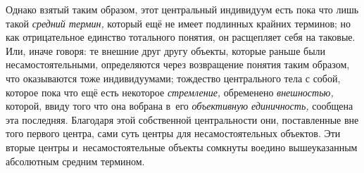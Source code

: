Однако взятый таким образом, этот центральный индивидуум есть
пока что лишь такой {\em средний
термин,} который ещё не имеет подлинных крайних терминов; но
как отрицательное единство тотального понятия, он расщепляет себя на
таковые. Или, иначе говоря: те внешние друг другу объекты, которые раньше
были несамостоятельными, определяются через возвращение понятия таким
образом, что оказываются тоже индивидуумами; тождество центрального тела с
собой, которое пока что ещё есть некоторое {\em стремление,} обременено
{\em внешностью,} которой, ввиду того что она вобрана в~его
{\em объективную единичность,} сообщена эта последняя.
Благодаря этой собственной
центральности они, поставленные вне того первого центра, сами суть центры
для несамостоятельных объектов. Эти вторые центры и~несамостоятельные
объекты сомкнуты воедино вышеуказанным абсолютным средним
термином.

